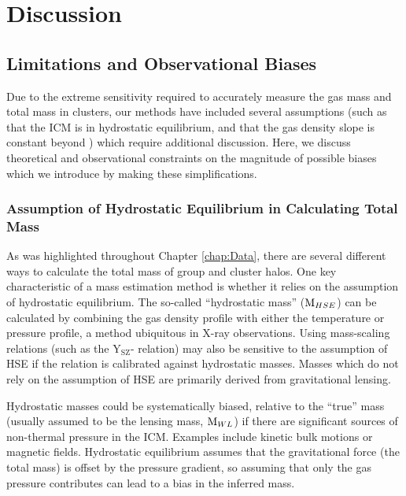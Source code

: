 \chapter{Discussion}
\label{chap:Discussion}

\section{Limitations and Observational Biases}
\label{sec:Limitations}

Due to the extreme sensitivity required to accurately measure the gas
mass and total mass in clusters, our methods have included several
assumptions (such as that the ICM is in hydrostatic equilibrium, and
that the gas density slope is constant beyond \rfive{}) which require
additional discussion. Here, we discuss theoretical and observational
constraints on the magnitude of possible biases which we introduce by
making these simplifications.

\subsection{Assumption of Hydrostatic Equilibrium in Calculating Total
Mass}
\label{sec:Limitations.HSE}
As was highlighted throughout Chapter \ref{chap:Data}, there are
several different ways to calculate the total mass of group and
cluster halos. One key characteristic of a mass estimation method is
whether it relies on the assumption of hydrostatic equilibrium. The
so-called ``hydrostatic mass'' ($\textrm{M}{}_{HSE}$) can be calculated by combining the gas
density profile with either the temperature or pressure profile, a
method ubiquitous in X-ray observations. Using mass-scaling relations
(such as the Y$_\textrm{SZ}$-\Mfive{} relation) may also be sensitive
to the assumption of HSE if the relation is calibrated against
hydrostatic masses. Masses which do not rely on the assumption of HSE
are primarily derived from gravitational lensing.

Hydrostatic masses could be systematically biased, relative to the
``true'' mass (usually assumed to be the lensing mass, $\textrm{M}{}_{WL}$)
if there are significant sources of non-thermal pressure in the
ICM. Examples include kinetic bulk motions or magnetic
fields. Hydrostatic equilibrium assumes that the gravitational force
(the total mass) is offset by the pressure gradient, so assuming that
only the gas pressure contributes can lead to a bias in the inferred
mass.

